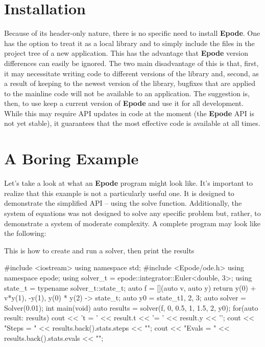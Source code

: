 \documentclass[letterpaper,10pt]{book}
\newcommand{\epode}[0]{\textbf{Epode}}
\begin{document}

    \section{Installation}
      Because of its header-only nature, there is no specific need to install \epode{}.  One has the option to treat it as a local library and to simply include the files in the project tree of a new application.  This has the advantage that \epode{} version differences can easily be ignored.  The two main disadvantage of this is that, first, it may necessitate writing code to different versions of the library and, second, as a result of keeping to the newest version of the library, bugfixes that are applied to the mainline code will not be available to an application.  The suggestion is, then, to use keep a current version of \epode{} and use it for all development.  While this may require API updates in code at the moment (the \epode{} API is not yet stable), it guarantees that the most effective code is available at all times.   

    \section{A Boring Example}
      Let's take a look at what an \epode{} program might look like.  It's important to realize that this example is not a particularly useful one.  It is designed to demonstrate the simplified API -- using the solve function.  Additionally, the system of equations was not designed to solve any specific problem but, rather, to demonstrate a system of moderate complexity.  A complete program may look like the following:
  \begin{listing}
    \label{lst:basic}
    \caption{This is how to create and run a solver, then print the results}  
    \begin{epodecode}
      #include <iostream>
      using namespace std;
      #include <Epode/ode.h>
      using namespace epode;
      using solver_t = epode::integrator::Euler<double, 3>;
      using state_t = typename solver_t::state_t;
      auto f = [](auto v, auto y){
	return {
	  y(0) + v*y(1),
	  -y(1),
	  y(0) * y(2)
	}
      } -> state_t;
      auto y0 = state_t{1, 2, 3};
      auto solver = Solver(0.01);
      int main(void) {
	auto results = solver(f, 0, {0.5, 1, 1.5, 2}, y0);    
	for(auto result: results) {
	  cout << 't = ' << result.t << '\ty = ' << result.y << '\n';
	}
	cout << "\tIteration Steps = " << results.back().stats.steps << "\n";
	cout << "\tFunction Evals = " << results.back().stats.evals << "\n";
      }
    \end{epodecode}
  \end{listing}
\end{document}
